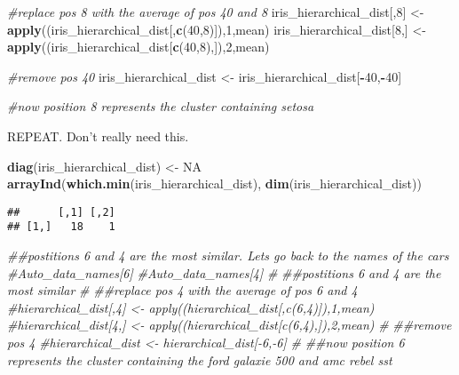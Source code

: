\documentclass[11pt,]{article}
\newenvironment{Shaded}{\begin{snugshade}}{\end{snugshade}}
\newcommand{\CommentTok}[1]{\textcolor[rgb]{0.56,0.35,0.01}{\textit{#1}}}
\newcommand{\DecValTok}[1]{\textcolor[rgb]{0.00,0.00,0.81}{#1}}
\newcommand{\KeywordTok}[1]{\textcolor[rgb]{0.13,0.29,0.53}{\textbf{#1}}}
\newcommand{\NormalTok}[1]{#1}
\newcommand{\OperatorTok}[1]{\textcolor[rgb]{0.81,0.36,0.00}{\textbf{#1}}}
\newcommand{\OtherTok}[1]{\textcolor[rgb]{0.56,0.35,0.01}{#1}}
\newcommand{\StringTok}[1]{\textcolor[rgb]{0.31,0.60,0.02}{#1}}
\begin{document}
\begin{Shaded}
\begin{Highlighting}[]
\CommentTok{#replace pos 8 with the average of pos 40 and 8}
\NormalTok{iris_hierarchical_dist[,}\DecValTok{8}\NormalTok{] <-}\StringTok{ }\KeywordTok{apply}\NormalTok{((iris_hierarchical_dist[,}\KeywordTok{c}\NormalTok{(}\DecValTok{40}\NormalTok{,}\DecValTok{8}\NormalTok{)]),}\DecValTok{1}\NormalTok{,mean)}
\NormalTok{iris_hierarchical_dist[}\DecValTok{8}\NormalTok{,] <-}\StringTok{ }\KeywordTok{apply}\NormalTok{((iris_hierarchical_dist[}\KeywordTok{c}\NormalTok{(}\DecValTok{40}\NormalTok{,}\DecValTok{8}\NormalTok{),]),}\DecValTok{2}\NormalTok{,mean)}

\CommentTok{#remove pos 40}
\NormalTok{iris_hierarchical_dist <-}\StringTok{ }\NormalTok{iris_hierarchical_dist[}\OperatorTok{-}\DecValTok{40}\NormalTok{,}\OperatorTok{-}\DecValTok{40}\NormalTok{]}

\CommentTok{#now position 8 represents the cluster containing setosa}
\end{Highlighting}
\end{Shaded}

REPEAT. Don't really need this.

\begin{Shaded}
\begin{Highlighting}[]
\KeywordTok{diag}\NormalTok{(iris_hierarchical_dist) <-}\StringTok{ }\OtherTok{NA}
\KeywordTok{arrayInd}\NormalTok{(}\KeywordTok{which.min}\NormalTok{(iris_hierarchical_dist), }\KeywordTok{dim}\NormalTok{(iris_hierarchical_dist))}
\end{Highlighting}
\end{Shaded}

\begin{verbatim}
##      [,1] [,2]
## [1,]   18    1
\end{verbatim}

\begin{Shaded}
\begin{Highlighting}[]
\CommentTok{##postitions 6 and 4 are the most similar. Lets go back to the names of the cars}
\CommentTok{#Auto_data_names[6]}
\CommentTok{#Auto_data_names[4]}
\CommentTok{#}
\CommentTok{##postitions 6 and 4 are the most similar}
\CommentTok{#}
\CommentTok{##replace pos 4 with the average of pos 6 and 4}
\CommentTok{#hierarchical_dist[,4] <- apply((hierarchical_dist[,c(6,4)]),1,mean)}
\CommentTok{#hierarchical_dist[4,] <- apply((hierarchical_dist[c(6,4),]),2,mean)}
\CommentTok{#}
\CommentTok{##remove pos 4}
\CommentTok{#hierarchical_dist <- hierarchical_dist[-6,-6]}
\CommentTok{#}
\CommentTok{##now position 6 represents the cluster containing the ford galaxie 500 and amc rebel sst}
\end{Highlighting}
\end{Shaded}
\end{document}
